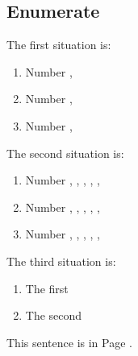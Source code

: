 \documentclass{article}
\begin{document}
        \subsection{Enumerate}
            The first situation is: 
            \begin{enumerate}
                \item Number \theenumi,      %
                \item Number \theenumi, 
                \item Number \theenumi, 
            \end{enumerate}
            The second situation is: 
            \begin{enumerate}
                \item Number
                    , , , 
                    , , 
                \item Number
                    , , , 
                    , , 
                \item Number
                    , , , 
                    , , 
            \end{enumerate}
            The third situation is: 
            {
                \renewcommand\theenumi{\roman{enumi}}
                \begin{enumerate}
                    \item The first
                    \item The second
                \end{enumerate}
            }
            This sentence is in Page \thepage. 
\end{document}
